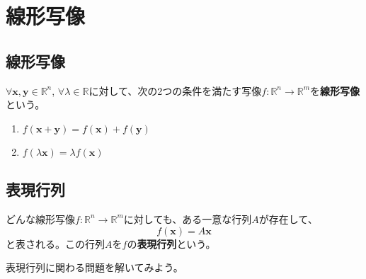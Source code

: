 \documentclass{jlreq}
\begin{document}
\section{線形写像}

\subsection{線形写像}
\begin{definitionbox}[線形写像]
  $\forall \boldsymbol{x}, \boldsymbol{y} \in \mathbb{R}^n$, $\forall \lambda \in \mathbb{R}$に対して、次の2つの条件を満たす写像$f: \mathbb{R}^n \to \mathbb{R}^m$を\textbf{線形写像}という。

  \begin{enumerate}
    \item $f(\boldsymbol{x} + \boldsymbol{y}) = f(\boldsymbol{x}) + f(\boldsymbol{y})$
    \item $f(\lambda \boldsymbol{x}) = \lambda f(\boldsymbol{x})$
  \end{enumerate}
\end{definitionbox}

\subsection{表現行列}

\begin{theorembox}[表現行列]
  どんな線形写像$f: \mathbb{R}^n \to \mathbb{R}^m$に対しても、ある一意な行列$A$が存在して、
  \begin{equation*}
    f(\boldsymbol{x}) = A \boldsymbol{x}
  \end{equation*}
  と表される。この行列$A$を$f$の\textbf{表現行列}という。
\end{theorembox}

表現行列に関わる問題を解いてみよう。
\end{document}
